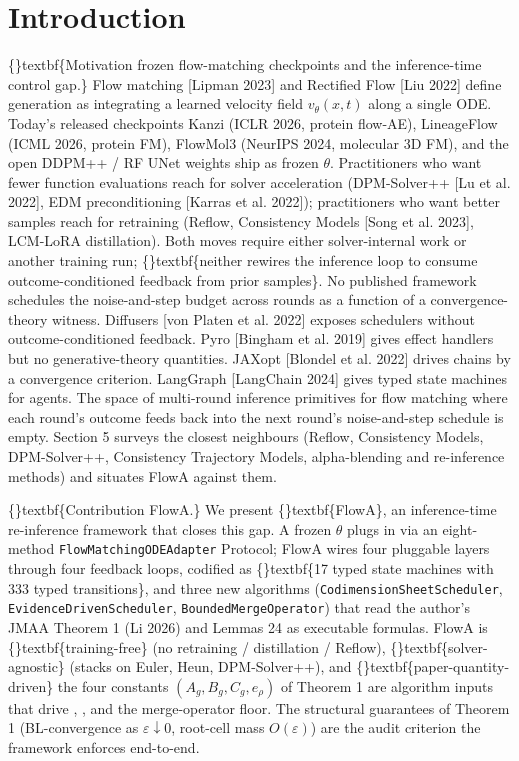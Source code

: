 \documentclass{article}
\begin{document}
\section{Introduction}
\{\}textbf\{Motivation  frozen flow-matching checkpoints and the inference-time control gap.\} Flow matching [Lipman 2023] and Rectified Flow [Liu 2022] define generation as integrating a learned velocity field $v_\theta(x, t)$ along a single ODE. Today's released checkpoints  Kanzi (ICLR 2026, protein flow-AE), LineageFlow (ICML 2026, protein FM), FlowMol3 (NeurIPS 2024, molecular 3D FM), and the open DDPM++ / RF UNet weights  ship as frozen $\theta$. Practitioners who want fewer function evaluations reach for solver acceleration (DPM-Solver++ [Lu et al. 2022], EDM preconditioning [Karras et al. 2022]); practitioners who want better samples reach for retraining (Reflow, Consistency Models [Song et al. 2023], LCM-LoRA distillation). Both moves require either solver-internal work or another training run; \{\}textbf\{neither rewires the inference loop to consume outcome-conditioned feedback from prior samples\}. No published framework schedules the noise-and-step budget across rounds as a function of a convergence-theory witness. Diffusers [von Platen et al. 2022] exposes schedulers without outcome-conditioned feedback. Pyro [Bingham et al. 2019] gives effect handlers but no generative-theory quantities. JAXopt [Blondel et al. 2022] drives chains by a convergence criterion. LangGraph [LangChain 2024] gives typed state machines for agents. The space of multi-round inference primitives for flow matching  where each round's outcome feeds back into the next round's noise-and-step schedule  is empty. Section 5 surveys the closest neighbours (Reflow, Consistency Models, DPM-Solver++, Consistency Trajectory Models, alpha-blending and re-inference methods) and situates FlowA against them.

\{\}textbf\{Contribution  FlowA.\} We present \{\}textbf\{FlowA\}, an inference-time re-inference framework that closes this gap. A frozen $\theta$ plugs in via an eight-method \texttt{FlowMatchingODEAdapter} Protocol; FlowA wires four pluggable layers through four feedback loops, codified as \{\}textbf\{17 typed state machines with 333 typed transitions\}, and three new algorithms (\texttt{CodimensionSheetScheduler}, \texttt{EvidenceDrivenScheduler}, \texttt{BoundedMergeOperator}) that read the author's JMAA Theorem 1 (Li 2026) and Lemmas 24 as executable formulas. FlowA is \{\}textbf\{training-free\} (no retraining / distillation / Reflow), \{\}textbf\{solver-agnostic\} (stacks on Euler, Heun, DPM-Solver++), and \{\}textbf\{paper-quantity-driven\}  the four constants $(A_g, B_g, C_g, e_\rho)$ of Theorem 1 are algorithm inputs that drive , , and the merge-operator floor. The structural guarantees of Theorem 1 (BL-convergence as $\varepsilon \downarrow 0$, root-cell mass $O(\varepsilon)$) are the audit criterion the framework enforces end-to-end.
\end{document}
